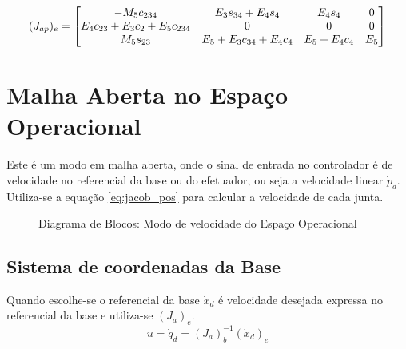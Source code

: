 \begin{equation}
({J}_{ap})_e =  
\begin{bmatrix}
    -M_5c_{234} & E_3s_{34}+E_4s_4 & E_4s_4 & 0 \\
    E_4c_{23}+E_3c_2+E_5c_{234} & 0 & 0 & 0 \\
    M_5s_{23} &  E_5+E_3c_{34}+E_4c_4 & E_5+E_4c_4 & E_5 
\end{bmatrix}
\end{equation}




\section{Malha Aberta no Espaço Operacional} 
Este é um modo em malha aberta, onde o sinal de entrada no controlador é de velocidade no referencial da base ou do efetuador, ou seja a velocidade linear ${\dot{p}}_d$. Utiliza-se a equação \eqref{eq:jacob_pos} para calcular a velocidade de cada junta. 

\begin{figure}[h!]
\centering
{}
\caption{Diagrama de Blocos: Modo de velocidade do Espaço Operacional}
\label{fig:vel_op}
\end{figure}


\subsection{Sistema de coordenadas da Base} \label{sec:openloopbase}
Quando escolhe-se o referencial da base ${\dot{x}}_d$ é velocidade desejada expressa no referencial da base e utiliza-se $({J}_{a})_e$.
\begin{equation}
{u} = {\dot{q}}_d = ({J}_{a})_b^{-1} ({\dot{x}}_d)_e
\end{equation}
